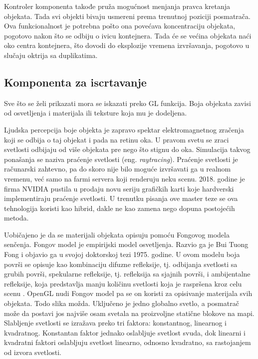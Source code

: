 \documentclass[12pt,oneside]{memoir}
\begin{document}
Kontroler komponenta takođe pruža mogućnost menjanja pravca kretanja objekata. 
Tada svi objekti bivaju usmereni prema trenutnoj poziciji posmatrača. 
Ova funkcionalnost je potrebna pošto ona povećava koncentraciju objekata, 
pogotovo nakon što se odbiju o ivicu kontejnera. Tada će se većina objekata 
naći oko centra kontejnera, što dovodi do eksplozije vremena izvršavanja, pogotovo u slučaju oktrija sa duplikatima.

\subsection{Komponenta za iscrtavanje}

Sve što se želi prikazati mora se iskazati preko GL funkcija. 
Boja objekata zavisi od osvetljenja i materijala ili teksture koja mu je dodeljena.

Ljudska percepcija boje objekta je zapravo spektar elektromagnetnog zračenja koji se odbija o taj objekat i pada na retinu oka.
U pravom svetu se zraci svetlosti odbijaju od više objekata pre nego što stignu do oka. 
Simulacija takvog ponašanja se naziva praćenje svetlosti (eng. {\em raytracing}).  
Praćenje svetlosti je računarski zahtevno, pa do skoro nije bilo moguće izvršavati ga u realnom vremenu, već samo na farmi servera koji renderuju neku scenu.
2018. godine je firma NVIDIA pustila u prodaju novu seriju grafičkih karti koje hardverski implementiraju praćenje svetlosti. 
U trenutku pisanja ove master teze se ova tehnologija koristi kao hibrid, dakle ne kao zamena nego dopuna postojećih metoda.

Uobičajeno je da se materijali objekata opisuju pomoću Fongovog modela senčenja. 
Fongov model je empirijski model osvetljenja. Razvio ga je Bui Tuong Fong i objavio ga u svojoj doktorskoj tezi 1975. godine.
U ovom modelu boja površi se opisuje kao kombinaciju difuzne refleksije, tj. odbijanja svetlosti sa grubih površi, 
spekularne refleksije, tj. refleksija sa sjajnih površi, i ambijentalne refleksije, koja predstavlja manju količinu svetlosti 
koja je raspršena kroz celu scenu \cite{Phong}.
OpenGL nudi Fongov model pa se on koristi za opisivanje materijala svih objekata.
Todo slika možda.
Uključeno je jedno globalno svetlo, a posmatrač može da postavi jos najviše osam svetala na 
proizvoljne statične blokove na mapi. 
Slabljenje svetlosti se izražava preko tri faktora: konstantnog, linearnog i kvadratnog.
Konstantan faktor jednako oslabljuje svetlost svuda, dok linearni i kvadratni faktori oslabljuju svetlost
linearno, odnosno kvadratno, sa rastojanjem od izvora svetlosti.
\end{document}
